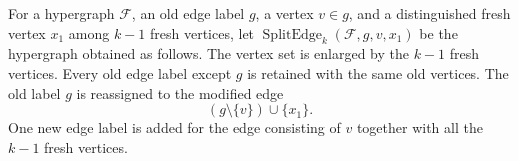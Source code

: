 \begin{definition}
For a hypergraph $\mathcal F$, an old edge label $g$, a vertex
$v\in g$, and a distinguished fresh vertex $x_1$ among $k-1$ fresh
vertices, let $\operatorname{SplitEdge}_k(\mathcal F,g,v,x_1)$ be the
hypergraph obtained as follows.  The vertex set is enlarged by the
$k-1$ fresh vertices.  Every old edge label except $g$ is retained with
the same old vertices.  The old label $g$ is reassigned to the modified
edge
\[
  (g\setminus\{v\})\cup\{x_1\}.
\]
One new edge label is added for the edge consisting of $v$ together with all
the $k-1$ fresh vertices.
\end{definition}
